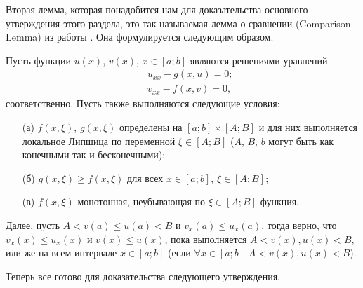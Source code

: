 Вторая лемма, которая понадобится нам для доказательства основного утверждения этого раздела, это так называемая лемма о сравнении (Comparison Lemma) из работы \cite{AlfZez}.
Она формулируется следующим образом.

\begin{lemma}[О сравнении]
Пусть функции $u(x)$, $v(x)$, $x \in [a; b]$ являются решениями уравнений
%
\begin{eqnarray}
&& u_{xx} - g(x, u) = 0; \\
&& v_{xx} - f(x, v) = 0,
\end{eqnarray}
%
соответственно.
Пусть также выполняются следующие условия:
\begin{itemize}
\item[(а)] $f(x, \xi)$, $g(x, \xi)$ определены на $[a; b] \times [A; B]$ и для них выполняется локальное Липшица по переменной $\xi \in [A; B]$ ($A$, $B$, $b$ могут быть как конечными так и бесконечными);
\item[(б)] $g(x, \xi) \ge f(x, \xi)$ для всех $x \in [a; b]$, $\xi \in [A; B]$;
\item[(в)] $f(x, \xi)$ монотонная, неубывающая по $\xi \in [A; B]$ функция.
\end{itemize}
Далее, пусть $A < v(a) \le u(a) < B$ и $v_x(a) \le u_x(a)$, тогда верно, что $v_x(x) \le u_x(x)$ и $v(x) \le u(x)$, пока выполняется $A < v(x), u(x) < B$, или же на всем интервале $x \in [a; b]$ (если $\forall x \in [a; b]$ $A < v(x), u(x) < B$).
\label{lemma:comparison}
\end{lemma}

Теперь все готово для доказательства следующего утверждения.

